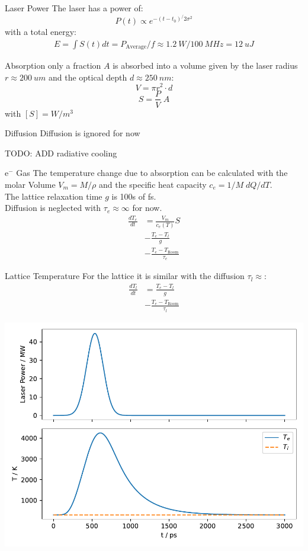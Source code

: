 \begin{frame}{Laser Power}
	The laser has a power of:
	$$P(t) \propto e^{-(t-t_0)^ / 2\sigma^2}$$
	with a total energy:
	\begin{align*}
		E = \int S(t) dt = P_\text{Average} / f \approx \SI{1.2}{W} / \SI{100}{MHz} = \SI{12}{uJ}
	\end{align*}
\end{frame}

\begin{frame}{Absorption}
	only a fraction $A$ is absorbed into a volume given by the laser radius $r\approx \SI{200}{um}$ and the optical depth $d\approx \SI{250}{nm}$:
	$$V=\pi r^2 \cdot d$$
	$$S = \frac{P}{V}\; A$$
	with $[S] = W/m^3$  
\end{frame}

\begin{frame}{Diffusion}
	Diffusion is ignored for now

	TODO: ADD radiative cooling
\end{frame}

\begin{frame}{e$^-$ Gas}
	The temperature change due to absorption can be calculated with the molar Volume $V_m = M / \rho$ and  the specific heat capacity $c_e= 1/M \; dQ/dT$.\\
	The lattice relaxation time $g$ is 100s of \si{fs}.\\
	Diffusion is neglected with $\tau_e\approx\infty$ for now.
	\begin{align*}
		\frac{dT_e}{dt}
		&= \frac{V_m}{c_e(T)}S\\
		&- \frac{T_e - T_l}{g}\\ 
		&- \frac{T_e - T_\text{Room}}{\tau_e}
	\end{align*}
\end{frame}

\begin{frame}{Lattice Temperature}
	For the lattice it is similar with the diffusion $\tau_l\approx$:
	\begin{align*}
		\frac{dT_l}{dt}
		&= \frac{T_e - T_l}{g}\\ 
		&- \frac{T_e - T_\text{Room}}{\tau_l}
	\end{align*}
\end{frame}

\begin{frame}
	\centering
	\includegraphics[width=.8\textwidth]{../model/figures/temperature profile.pdf}
\end{frame}

